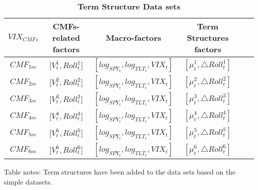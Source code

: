 \documentclass[10pt,letterpaper]{article}
\begin{document}
\begin{table}[!ht]
\centering
\caption{
{\bf Term Structure Data sets}}
\begin{tabular}{|c|c|c|c|c|c|} %
    \hline %
    \(VIX_{CMFs}\)  & CMFs-related factors & Macro-factors & Term Structures factors \\
    \hline %
    \(CMF_{1m}\)  & \({[V_{t}^1},{Roll_{t}^1]}\) & \([log_{SPY_t},log_{TLT_t},VIX_t]\) & \({[\mu_{t}^1, \triangle Roll_{t}^1]}\)  \\
    \hline
    \(CMF_{2m}\)  & \({[V_{t}^2},{Roll_{t}^2]}\)  & \([log_{SPY_t},log_{TLT_t},VIX_t]\) &  \({[\mu_{t}^2, \triangle Roll_{t}^2]}\) \\
    \hline
    \(CMF_{3m}\)  & \({[V_{t}^3},{Roll_{t}^3]}\) & \([log_{SPY_t},log_{TLT_t},VIX_t]\) & \({[\mu_{t}^3, \triangle Roll_{t}^3]}\) \\
    \hline
    \(CMF_{4m}\)& \({[V_{t}^4},{Roll_{t}^4]}\) & \([log_{SPY_t},log_{TLT_t},VIX_t]\) & \({[\mu_{t}^4, \triangle Roll_{t}^4]}\)\\
    \hline
    \(CMF_{5m}\) &  \({[V_{t}^5},{Roll_{t}^5]}\) & \([log_{SPY_t},log_{TLT_t},VIX_t]\) & \({[\mu_{t}^5, \triangle Roll_{t}^5]}\) \\
    \hline
    \(CMF_{6m}\) & \({[V_{t}^6},{Roll_{t}^6]}\) & \([log_{SPY_t},log_{TLT_t},VIX_t]\) & \({[\mu_{t}^6, \triangle Roll_{t}^6]}\)  \\
    \hline %
  \end{tabular}
\begin{flushleft} Table notes: Term structures have been added to the data sets based on the simple datasets.
\end{flushleft}
\label{table1}
\end{table}
\end{document}
